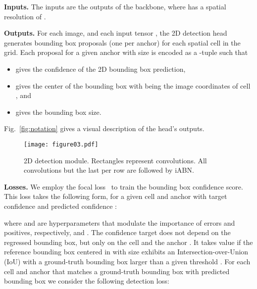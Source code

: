 \documentclass[10pt,twocolumn,letterpaper]{article}
\newcommand{\iABNsync}{iABN\xspace}
\renewcommand{\paragraph}[1]{

        \vspace{3pt}
	\noindent\textbf{#1}}
\begin{document}
\paragraph{Inputs.}
The inputs are the  outputs  of the backbone, where  has a spatial resolution of .

\paragraph{Outputs.}
For each image, and each input tensor , the 2D detection head generates  bounding box proposals (one per anchor) for each spatial cell  in the  grid. Each proposal for a given anchor  with size  is encoded as a -tuple  such that 
\begin{itemize}
\item  gives the confidence of the 2D bounding box prediction,
\item  gives the center of the bounding box with  being the image coordinates of cell , and
\item  gives the bounding box size.
\end{itemize}
Fig.~\ref{fig:notation} gives a visual description of the head's outputs.

\begin{figure}
    \centering
    \texttt{[image: figure03.pdf]}
    \caption{2D detection module. Rectangles represent convolutions. All convolutions but the last per row are followed by \iABNsync.}
    \label{fig:head2d}
    \vspace{-12pt}
\end{figure}

\paragraph{Losses.}
We employ the focal loss~\cite{Lin+17} to train the bounding box confidence score. This loss takes the following form, for a given cell  and anchor  with target confidence  and predicted confidence :

where  and  are hyperparameters that modulate the importance of errors and positives, respectively,  and .
The confidence target  does not depend on the regressed bounding box, but only on the cell  and the anchor . It takes value  if the reference bounding box centered in  with size  exhibits an Intersection-over-Union (IoU) with a ground-truth bounding box larger than a given threshold .
For each cell  and anchor  that matches a ground-truth bounding box 
with predicted bounding box 
we consider the following detection loss:
\end{document}
